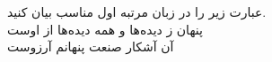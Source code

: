 	عبارت زیر را در زبان مرتبه اول مناسب بیان کنید.\\
	پنهان ز دیده‌ها و همه دیده‌ها از اوست\\
	آن آشکار صنعت پنهانم آرزوست
